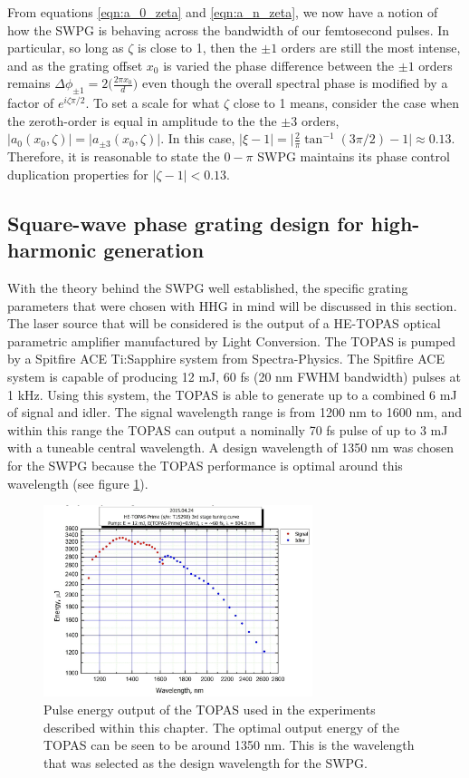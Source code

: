 From equations \ref{eqn:a_0_zeta} and \ref{eqn:a_n_zeta}, we now have a notion of how the SWPG is behaving across the bandwidth of our femtosecond pulses.  In particular, so long as $\zeta$ is close to 1, then the $\pm1$ orders are still the most intense, and as the grating offset $x_0$ is varied the phase difference between the $\pm1$ orders remains $\Delta\phi_{\pm1}=2\bigg(\frac{2\pi x_0}{d}\bigg)$ even though the overall spectral phase is modified by a factor of $e^{i\zeta\pi/2}$.  To set a scale for what $\zeta$ close to 1 means, consider the case when the zeroth-order is equal in amplitude to the the $\pm3$ orders, $\rvert a_0(x_0,\zeta)\rvert = \rvert a_{\pm3}(x_0,\zeta)\rvert$.  In this case, $\rvert \xi - 1\rvert=\rvert\frac{2}{\pi}\tan^{-1}(3\pi/2)-1\rvert\approx0.13$.  Therefore, it is reasonable to state the $0-\pi$ SWPG maintains its phase control duplication properties for $\rvert\zeta - 1\rvert<0.13$.

\subsection{Square-wave phase grating design for high-harmonic generation}
With the theory behind the SWPG well established, the specific grating parameters that were chosen with HHG in mind will be discussed in this section.  The laser source that will be considered is the output of a HE-TOPAS optical parametric amplifier manufactured by Light Conversion.  The TOPAS is pumped by a Spitfire ACE Ti:Sapphire system from Spectra-Physics.  The Spitfire ACE system is capable of producing  12 mJ, 60 fs (20 nm FWHM bandwidth) pulses at 1 kHz.  Using this system, the TOPAS is able to generate up to a combined 6 mJ of signal and idler. The signal wavelength range is from 1200 nm to 1600 nm, and within this range the TOPAS can output a nominally 70 fs pulse of up to 3 mJ with a tuneable central wavelength.  A design wavelength of 1350 nm was chosen for the SWPG because the TOPAS performance is optimal around this wavelength (see figure \ref{fig:TOPAS_output}).
\begin{figure}
	\centering
	\includegraphics[width=0.7\textwidth]{figures/TOPAS/Topas_output.png}
	\caption[Pulse energy output of HE-TOPAS at various wavelengths]{Pulse energy output of the TOPAS used in the experiments described within this chapter.  The optimal output energy of the TOPAS can be seen to be around 1350 nm.  This is the wavelength that was selected as the design wavelength for the SWPG.}
	\label{fig:TOPAS_output}
\end{figure}

